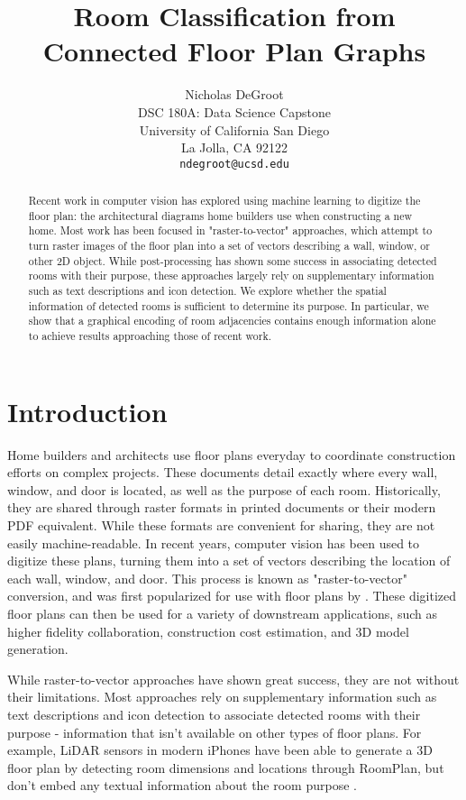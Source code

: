 \documentclass{article}
\title{Room Classification from Connected Floor Plan Graphs}
\author{
Nicholas DeGroot \\
DSC 180A: Data Science Capstone \\
University of California San Diego\\
La Jolla, CA 92122 \\
\texttt{ndegroot@ucsd.edu}
}
\begin{document}
\maketitle

\begin{abstract}

Recent work in computer vision has explored using machine learning to digitize the floor plan: the architectural diagrams home builders use when constructing a new home. Most work has been focused in "raster-to-vector" approaches, which attempt to turn raster images of the floor plan into a set of vectors describing a wall, window, or other 2D object. While post-processing has shown some success in associating detected rooms with their purpose, these approaches largely rely on supplementary information such as text descriptions and icon detection. We explore whether the spatial information of detected rooms is sufficient to determine its purpose. In particular, we show that a graphical encoding of room adjacencies contains enough information alone to achieve results approaching those of recent work.

\end{abstract}

\section{Introduction}

Home builders and architects use floor plans everyday to coordinate construction efforts on complex projects. These documents detail exactly where every wall, window, and door is located, as well as the purpose of each room. Historically, they are shared through raster formats in printed documents or their modern PDF equivalent. While these formats are convenient for sharing, they are not easily machine-readable. In recent years, computer vision has been used to digitize these plans, turning them into a set of vectors describing the location of each wall, window, and door. This process is known as "raster-to-vector" conversion, and was first popularized for use with floor plans by \citet{rastertovec2017}. These digitized floor plans can then be used for a variety of downstream applications, such as higher fidelity collaboration, construction cost estimation, and 3D model generation.

While raster-to-vector approaches have shown great success, they are not without their limitations. Most approaches rely on supplementary information such as text descriptions and icon detection to associate detected rooms with their purpose - information that isn't available on other types of floor plans. For example, LiDAR sensors in modern iPhones have been able to generate a 3D floor plan by detecting room dimensions and locations through RoomPlan, but don't embed any textual information about the room purpose \cite{appleroomplan}.
\end{document}
